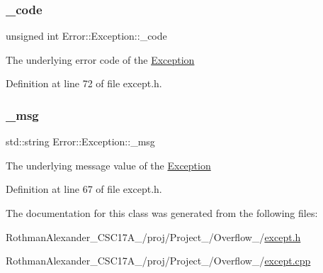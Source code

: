 \subsubsection{\texorpdfstring{\+\_\+code}{\_code}}
{\footnotesize\ttfamily unsigned int Error\+::\+Exception\+::\+\_\+code\hspace{0.3cm}{\ttfamily [protected]}}

The underlying error code of the \hyperlink{class_error_1_1_exception}{Exception} 

Definition at line 72 of file except.\+h.

\hypertarget{class_error_1_1_exception_a61695262013be27ae2053111c70f03a5}{}\label{class_error_1_1_exception_a61695262013be27ae2053111c70f03a5} 
\subsubsection{\texorpdfstring{\+\_\+msg}{\_msg}}
{\footnotesize\ttfamily std\+::string Error\+::\+Exception\+::\+\_\+msg\hspace{0.3cm}{\ttfamily [protected]}}

The underlying message value of the \hyperlink{class_error_1_1_exception}{Exception} 

Definition at line 67 of file except.\+h.



The documentation for this class was generated from the following files\+:\begin{DoxyCompactItemize}
\item 
Rothman\+Alexander\+\_\+\+C\+S\+C17\+A\+\_/proj/\+Project\+\_/\+Overflow\+\_/\hyperlink{except_8h}{except.\+h}\item 
Rothman\+Alexander\+\_\+\+C\+S\+C17\+A\+\_/proj/\+Project\+\_/\+Overflow\+\_/\hyperlink{except_8cpp}{except.\+cpp}\end{DoxyCompactItemize}

